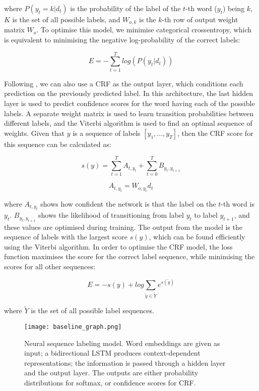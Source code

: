\documentclass[11pt]{article}
\begin{document}
\noindent where $P (y_t = k|d_t )$ is the probability of the label of the $t$-th word ($y_t$) being $k$, $K$ is the set of all possible labels, and $W_{o,k}$ is the $k$-th row of output weight matrix $W_o$. To optimise this model, we minimise categorical crossentropy, which is equivalent to minimising the negative log-probability of the correct labels:

\begin{equation}
E = - \sum_{t=1}^{T} log(P(y_t| d_t))
\end{equation}

Following , we can also use a CRF as the output layer, which conditions each prediction on the previously predicted label. In this architecture, the last hidden layer is used to predict confidence scores for the word having each of the possible labels. A separate weight matrix is used to learn transition probabilities between different labels, and the Viterbi algorithm is used to find an optimal sequence of weights. Given that $y$ is a sequence of labels $[y_1, ..., y_T]$, then the CRF score for this sequence can be calculated as:

\begin{equation}
s(y) = \sum_{t=1}^T A_{t,y_t} + \sum_{t=0}^T B_{y_t,y_{t+1}}
\end{equation}

\begin{equation}
A_{t,y_t} = W_{o,y_t} d_t
\end{equation}

\noindent where $A_{t,y_t}$ shows how confident the network is that the label on the $t$-th word is $y_t$. $B_{y_t,y_{t+1}}$ shows the likelihood of transitioning from label $y_t$ to label $y_{t+1}$, and these values are optimised during training. The output from the model is the sequence of labels with the largest score $s(y)$, which can be found efficiently using the Viterbi algorithm. In order to optimise the CRF model, the loss function maximises the score for the correct label sequence, while minimising the scores for all other sequences:

\begin{equation}
E = - s(y) + log \sum_{\tilde{y} \in \widetilde{Y}} e^{s(\tilde{y})}
\end{equation}

\noindent where $\widetilde{Y}$ is the set of all possible label sequences. 



\begin{figure}[t]
    \centering
	\texttt{[image: baseline\_graph.png]}
	\caption{Neural sequence labeling model. Word embeddings are given as input; a bidirectional LSTM produces context-dependent representations; the information is passed through a hidden layer and the output layer. The outputs are either probability distributions for softmax, or confidence scores for CRF. }
	\label{fig:baseline}
\end{figure}
\end{document}

